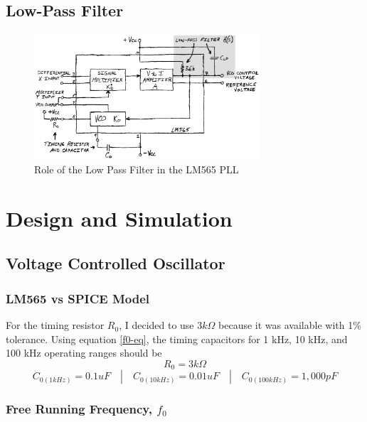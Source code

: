 \documentclass[titlepage, letterpaper, 10.5pt]{article}
\begin{document}
\clearpage
\subsection{Low-Pass Filter}

\begin{figure}[ht]
	\centering
	\includegraphics[width=0.75\textwidth]{diagrams/565-block-diagram-low-pass-filter}
	\caption{Role of the Low Pass Filter in the LM565 PLL}
	\label{565-block-diagram-low-pass-filter}
\end{figure}


\section{Design and Simulation}

\subsection{Voltage Controlled Oscillator}

\subsubsection{LM565 vs SPICE Model}

For the timing resistor $R_{0}$, I decided to use $3k\Omega$ because it was available with 1\% tolerance.
Using equation \ref{f0-eq}, the timing capacitors for 1 kHz, 10 kHz, and 100 kHz operating ranges should be
\begin{equation*}
R_{0}=3k\Omega
\end{equation*}
\begin{equation*}
C_{0(1kHz)}=0.1uF \quad | \quad C_{0(10kHz)}=0.01uF \quad | \quad C_{0(100kHz)}=1,000pF
\end{equation*}

\subsubsection{Free Running Frequency, $f_{0}$}
\end{document}
